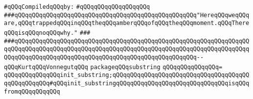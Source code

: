 \label{src/lib/std/src/substring.pkg}
\newline
\verb|#qQQqCompiledqQQqby:|\newline
\verb|#qQQqqQQqqQQqqQQqqQQq|\newline
\newline
\verb|###qQQqqQQqqQQqqQQqqQQqqQQqqQQqqQQqqQQqqQQqqQQqqQQqqQQq"HereqQQqweqQQqare,qQQqtrappedqQQqinqQQqtheqQQqamberqQQqofqQQqtheqQQqmoment.qQQqThereqQQqisqQQqnoqQQqwhy."|\newline
\verb|###|\newline
\verb|###qQQqqQQqqQQqqQQqqQQqqQQqqQQqqQQqqQQqqQQqqQQqqQQqqQQqqQQqqQQqqQQqqQQqqQQqqQQqqQQqqQQqqQQqqQQqqQQqqQQqqQQqqQQqqQQqqQQqqQQqqQQqqQQqqQQqqQQqqQQqqQQqqQQqqQQqqQQqqQQqqQQqqQQqqQQqqQQqqQQqqQQqqQQqqQQq--qQQqKurtqQQqVonnegutqQQq|\newline
\newline
\newline
\newline
\verb|packageqQQqsubstring|\newline
\verb|qQQqqQQqqQQqqQQq=|\newline
\verb|qQQqqQQqqQQqqQQqinit_substring;qQQqqQQqqQQqqQQqqQQqqQQqqQQqqQQqqQQqqQQqqQQqqQQqqQQq#qQQqinit_substringqQQqqQQqqQQqqQQqqQQqqQQqqQQqqQQqisqQQqfromqQQqqQQqqQQq|\newline

